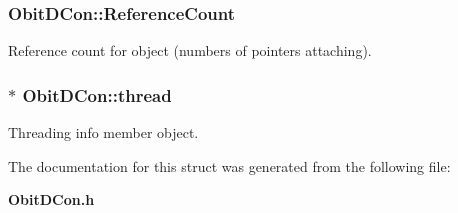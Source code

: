 \subsubsection{ {\bf Obit\-DCon::Reference\-Count}}\label{structObitDCon_o2}


Reference count for object (numbers of pointers attaching). 

\subsubsection{$\ast$ {\bf Obit\-DCon::thread}}\label{structObitDCon_o4}


Threading info member object. 



The documentation for this struct was generated from the following file:\begin{CompactItemize}
\item 
{\bf Obit\-DCon.h}\end{CompactItemize}

